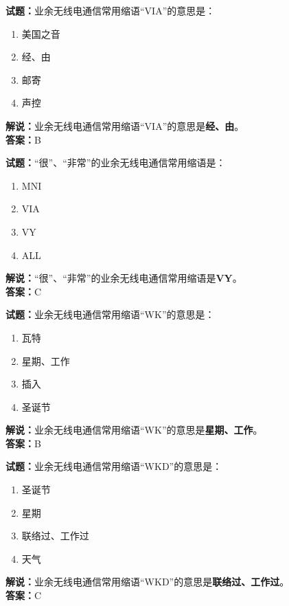 \documentclass{ctexbook}
\begin{document}
\bigskip


\noindent\textbf{试题：}业余无线电通信常用缩语“VIA”的意思是：
\begin{enumerate}[leftmargin=3em]
\item 美国之音%
\item 经、由
\item 邮寄
\item 声控
\end{enumerate}
\noindent\textbf{解说：}业余无线电通信常用缩语“VIA”的意思是\textbf{经、由}。\\\noindent\textbf{答案：}B


\bigskip


\noindent\textbf{试题：}“很”、“非常”的业余无线电通信常用缩语是：
\begin{enumerate}[leftmargin=3em]
\item MNI
\item VIA
\item VY
\item ALL
\end{enumerate}
\noindent\textbf{解说：}“很”、“非常”的业余无线电通信常用缩语是\textbf{VY}。\\\noindent\textbf{答案：}C



\bigskip


\noindent\textbf{试题：}业余无线电通信常用缩语“WK”的意思是：
\begin{enumerate}[leftmargin=3em]
\item 瓦特
\item 星期、工作
\item 插入
\item 圣诞节
\end{enumerate}
\noindent\textbf{解说：}业余无线电通信常用缩语“WK”的意思是\textbf{星期、工作}。\\\noindent\textbf{答案：}B


\bigskip


\noindent\textbf{试题：}业余无线电通信常用缩语“WKD”的意思是：
\begin{enumerate}[leftmargin=3em]
\item 圣诞节
\item 星期
\item 联络过、工作过
\item 天气
\end{enumerate}
\noindent\textbf{解说：}业余无线电通信常用缩语“WKD”的意思是\textbf{联络过、工作过}。\\\noindent\textbf{答案：}C
\end{document}
